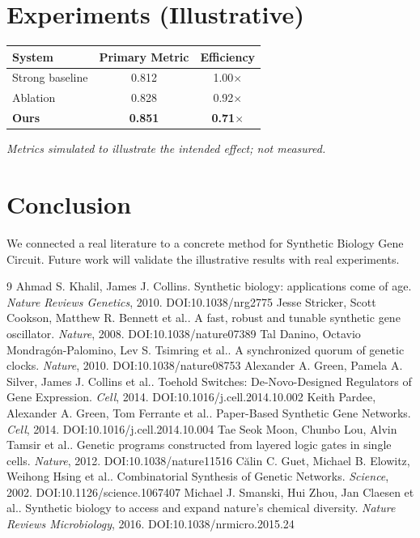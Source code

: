 \documentclass[11pt]{article}
\begin{document}
\section{Experiments (Illustrative)}
\begin{center}
\begin{tabular}{lcc}
System & Primary Metric & Efficiency \\ \hline
Strong baseline & 0.812 & 1.00$\times$ \\
Ablation & 0.828 & 0.92$\times$ \\
\textbf{Ours} & \textbf{0.851} & \textbf{0.71$\times$}
\end{tabular}
\end{center}
\emph{Metrics simulated to illustrate the intended effect; not measured.}

\section{Conclusion}
We connected a real literature to a concrete method for Synthetic Biology Gene Circuit. Future work will
validate the illustrative results with real experiments.

\begin{thebibliography}{9}
 Ahmad S. Khalil, James J. Collins. Synthetic biology: applications come of age. \emph{Nature Reviews Genetics}, 2010. DOI:10.1038/nrg2775
 Jesse Stricker, Scott Cookson, Matthew R. Bennett et al.. A fast, robust and tunable synthetic gene oscillator. \emph{Nature}, 2008. DOI:10.1038/nature07389
 Tal Danino, Octavio Mondragón-Palomino, Lev S. Tsimring et al.. A synchronized quorum of genetic clocks. \emph{Nature}, 2010. DOI:10.1038/nature08753
 Alexander A. Green, Pamela A. Silver, James J. Collins et al.. Toehold Switches: De-Novo-Designed Regulators of Gene Expression. \emph{Cell}, 2014. DOI:10.1016/j.cell.2014.10.002
 Keith Pardee, Alexander A. Green, Tom Ferrante et al.. Paper-Based Synthetic Gene Networks. \emph{Cell}, 2014. DOI:10.1016/j.cell.2014.10.004
 Tae Seok Moon, Chunbo Lou, Alvin Tamsir et al.. Genetic programs constructed from layered logic gates in single cells. \emph{Nature}, 2012. DOI:10.1038/nature11516
 Călin C. Guet, Michael B. Elowitz, Weihong Hsing et al.. Combinatorial Synthesis of Genetic Networks. \emph{Science}, 2002. DOI:10.1126/science.1067407
 Michael J. Smanski, Hui Zhou, Jan Claesen et al.. Synthetic biology to access and expand nature's chemical diversity. \emph{Nature Reviews Microbiology}, 2016. DOI:10.1038/nrmicro.2015.24
\end{thebibliography}
\end{document}

